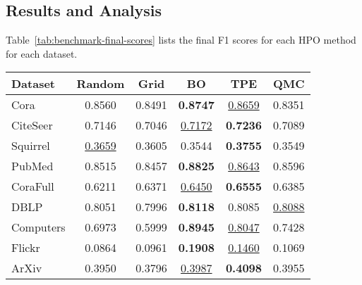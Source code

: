 \subsection{Results and Analysis}
Table~\ref{tab:benchmark-final-scores} lists the final F1 scores for each HPO method for each dataset.

\begin{table*}
	\caption{Final F1 scores for each HPO method and for each dataset, averaged over 10 independent runs. The best method is \textbf{bold} and the second best is \underline{underlined}.}
	\label{tab:benchmark-final-scores}
	\centering
	\begin{tabular}{lccccc}
		\toprule
		\textbf{Dataset} & \textbf{Random}    & \textbf{Grid} & \textbf{BO}        & \textbf{TPE}       & \textbf{QMC}       \\
		\midrule
		Cora             & 0.8560             & 0.8491        & \textbf{0.8747}    & \underline{0.8659} & 0.8351             \\
		CiteSeer         & 0.7146             & 0.7046        & \underline{0.7172} & \textbf{0.7236}    & 0.7089             \\
		Squirrel         & \underline{0.3659} & 0.3605        & 0.3544             & \textbf{0.3755}    & 0.3549             \\
		PubMed           & 0.8515             & 0.8457        & \textbf{0.8825}    & \underline{0.8643} & 0.8596             \\
		CoraFull         & 0.6211             & 0.6371        & \underline{0.6450} & \textbf{0.6555}    & 0.6385             \\
		DBLP             & 0.8051             & 0.7996        & \textbf{0.8118}    & 0.8085             & \underline{0.8088} \\
		Computers        & 0.6973             & 0.5999        & \textbf{0.8945}    & \underline{0.8047} & 0.7428             \\
		Flickr           & 0.0864             & 0.0961        & \textbf{0.1908}    & \underline{0.1460} & 0.1069             \\
		ArXiv            & 0.3950             & 0.3796        & \underline{0.3987} & \textbf{0.4098}    & 0.3955             \\
		\bottomrule
	\end{tabular}
\end{table*}

\begin{figure*}
	\centering
	\resizebox{\linewidth}{!}{%
		
	}
	\caption{Ranks-over-time of the benchmarked HPO methods over the progress of the optimization.}
	\label{fig:benchmark-ranks}
\end{figure*}
